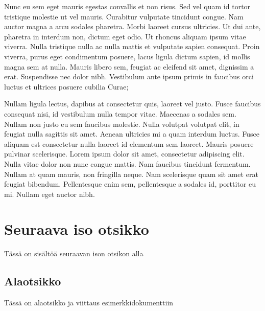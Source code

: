\documentclass[a4paper]{article}
\begin{document}
Nunc eu sem eget mauris egestas convallis et non risus. Sed vel quam id tortor tristique molestie ut vel mauris. Curabitur vulputate tincidunt congue. Nam auctor magna a arcu sodales pharetra. Morbi laoreet cursus ultricies. Ut dui ante, pharetra in interdum non, dictum eget odio. Ut rhoncus aliquam ipsum vitae viverra. Nulla tristique nulla ac nulla mattis et vulputate sapien consequat. Proin viverra, purus eget condimentum posuere, lacus ligula dictum sapien, id mollis magna sem at nulla. Mauris libero sem, feugiat ac eleifend sit amet, dignissim a erat. Suspendisse nec dolor nibh. Vestibulum ante ipsum primis in faucibus orci luctus et ultrices posuere cubilia Curae;

Nullam ligula lectus, dapibus at consectetur quis, laoreet vel justo. Fusce faucibus consequat nisi, id vestibulum nulla tempor vitae. Maecenas a sodales sem. Nullam non justo eu sem faucibus molestie. Nulla volutpat volutpat elit, in feugiat nulla sagittis sit amet. Aenean ultricies mi a quam interdum luctus. Fusce aliquam est consectetur nulla laoreet id elementum sem laoreet. Mauris posuere pulvinar scelerisque. Lorem ipsum dolor sit amet, consectetur adipiscing elit. Nulla vitae dolor non nunc congue mattis. Nam faucibus tincidunt fermentum. Nullam at quam mauris, non fringilla neque. Nam scelerisque quam sit amet erat feugiat bibendum. Pellentesque enim sem, pellentesque a sodales id, porttitor eu mi. Nullam eget auctor nibh.

\section{Seuraava iso otsikko}

Tässä on sisältöä seuraavan ison otsikon alla

\subsection{Alaotsikko}

Tässä on alaotsikko ja viittaus esimerkkidokumenttiin \citep{koski2012}




\end{document}
